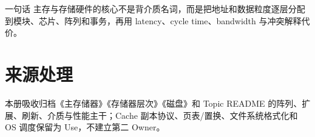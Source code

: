 \documentclass[UTF8,fontset=fandol,11pt,a4paper]{ctexart}
\begin{document}
\begin{corebox}{一句话}
主存与存储硬件的核心不是背介质名词，而是把地址和数据粒度逐层分配到模块、芯片、阵列和事务，再用 latency、cycle time、bandwidth 与冲突解释代价。
\end{corebox}

\section{来源处理}
本册吸收归档《主存储器》《存储器层次》《磁盘》和 Topic README 的阵列、扩展、刷新、介质与性能主干；Cache 副本协议、页表/置换、文件系统格式化和 OS 调度保留为 Use，不建立第二 Owner。
\end{document}

